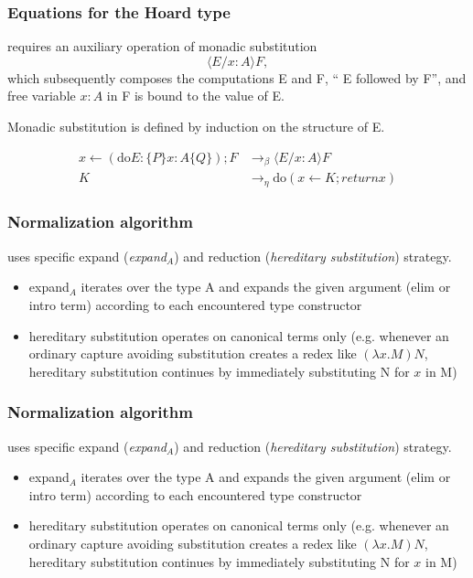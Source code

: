 \documentclass[xcolor=dvipsnames,9pt,hide notes,mathserif]{beamer}
\begin{document}
\begin{frame}
  \frametitle{Equations for the Hoard type}
requires an auxiliary operation of monadic substitution
\[
\langle E/x{:}A \rangle F,
\]
which subsequently composes the computations E and F, `` E followed by F'',
and free variable $x{:}A$ in F is bound to the value of E.

\vskip1cm
Monadic substitution is defined by induction on the structure of E.


\begin{align*}
x \longleftarrow (\mathrm{do} E : \{P\} x{:}A \{Q\}); F &\longrightarrow_\beta \langle E/x{:}A \rangle F\\
                                         K &\longrightarrow_\eta \mathrm{do} (x \longleftarrow K; return x)
\end{align*}

\end{frame}






\begin{frame}
  \frametitle{Normalization algorithm}
uses specific expand (\textit{expand$_A$}) and reduction (\textit{hereditary substitution}) strategy.

\begin{itemize}
\item expand$_A$ iterates over the type A and expands the given argument (elim or intro term) according to each encountered type constructor
\item hereditary substitution operates on canonical terms only (e.g. whenever an ordinary capture avoiding substitution creates a redex like $(\lambda x.M)N$, hereditary substitution continues by immediately substituting N for $x$ in M)
\end{itemize}

\end{frame}




\begin{frame}
  \frametitle{Normalization algorithm}
uses specific expand (\textit{expand$_A$}) and reduction (\textit{hereditary substitution}) strategy.

\begin{itemize}
\item expand$_A$ iterates over the type A and expands the given argument (elim or intro term) according to each encountered type constructor
\item hereditary substitution operates on canonical terms only (e.g. whenever an ordinary capture avoiding substitution creates a redex like $(\lambda x.M)N$, hereditary substitution continues by immediately substituting N for $x$ in M)
\end{itemize}

\end{frame}
\end{document}
